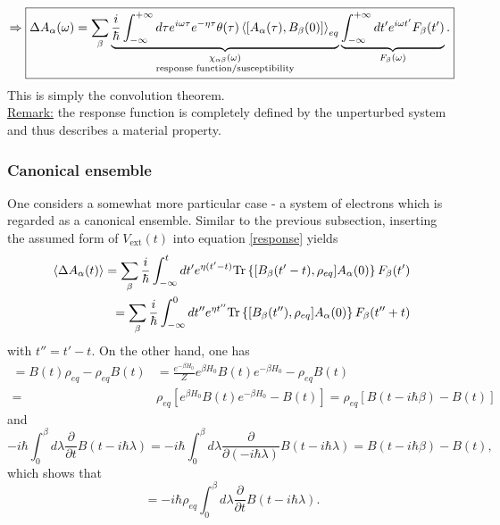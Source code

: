 \documentclass[a4paper,12pts,dvipsnames]{article}
\numberwithin{equation}{section}
\begin{document}
\begin{equation}
	\Rightarrow\boxed{\Delta A_{\alpha}(\omega) = \sum_{\beta}\underbrace{\frac{i}{\hbar}\int^{+\infty}_{-\infty} d\tau e^{i\omega\tau}e^{-\eta\tau}\theta(\tau)\braket{[A_{\alpha}(\tau),B_{\beta}(0)]}_{eq}}_{\substack{\chi_{\alpha\beta}(\omega)\\ \text{response function/susceptibility}}}\underbrace{\int^{+\infty}_{-\infty}dt'e^{i\omega t'}F_{\beta}(t')}_{F_{\beta}(\omega)}.}
\end{equation}
This is simply the convolution theorem.\\
\underline{Remark:} the response function is completely defined by the unperturbed system and thus describes a material property.
\subsubsection{Canonical ensemble}
One considers a somewhat more particular case - a system of electrons which is regarded as a canonical ensemble. Similar to the previous subsection, inserting the assumed form of $V_{\text{ext}}(t)$ into equation \ref{response} yields
\begin{align}
	\braket{\Delta A_{\alpha}(t)} = \sum_{\beta}\frac{i}{\hbar}\int^t_{-\infty}dt' e^{\eta(t'-t)}\text{Tr}\left\lbrace[B_{\beta}(t'-t),\rho_{eq}]A_{\alpha}(0)\right\rbrace F_{\beta}(t')\\
	= \sum_{\beta}\frac{i}{\hbar}\int^0_{-\infty}dt'' e^{\eta t''}\text{Tr}\left\lbrace[B_{\beta}(t''),\rho_{eq}]A_{\alpha}(0)\right\rbrace F_{\beta}(t''+t)
\end{align}
with $t''=t'-t$. On the other hand, one has
\begin{align}
	[B(t),\rho_{eq}] = B(t)\rho_{eq} - \rho_{eq}B(t) &= \frac{e^{-\beta H_0}}{Z}e^{\beta H_0}B(t)e^{-\beta H_0} - \rho_{eq}B(t)\nonumber\\
	=& \rho_{eq}\left[e^{\beta H_0}B(t)e^{-\beta H_0} - B(t)\right] = \rho_{eq}\left[B(t-i\hbar\beta) - B(t)\right]
\end{align}
and
\begin{equation}
	-i\hbar\int^{\beta}_0d\lambda\frac{\partial}{\partial t}B(t-i\hbar\lambda) = -i\hbar\int^{\beta}_0d\lambda\frac{\partial}{\partial(-i\hbar\lambda)}B(t-i\hbar\lambda) = B(t-i\hbar\beta) - B(t),
\end{equation}
which shows that
\begin{equation}
	[B(t),\rho_{eq}] = -i\hbar\rho_{eq}\int^{\beta}_0d\lambda\frac{\partial}{\partial t}B(t-i\hbar\lambda).
\end{equation}
\end{document}
